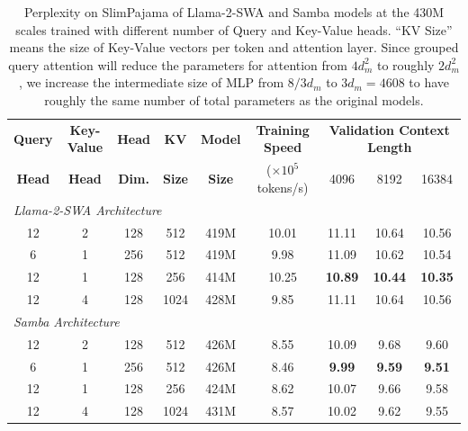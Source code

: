 \documentclass{article}
\begin{document}
\begin{table}[!htp]
\centering
\small
\caption{Perplexity on SlimPajama of Llama-2-SWA and Samba models at the 430M scales trained with different number of Query and Key-Value heads. ``KV Size'' means the size of Key-Value vectors per token and attention layer. Since grouped query attention will reduce the parameters for attention from $4d_m^2$ to roughly $2d_m^2$, we increase the intermediate size of MLP from $8/3 d_m$ to $3 d_m = 4608$ to have roughly the same number of total parameters as the original models. } 
\vspace{0.cm}
\begin{tabular}{ccccccccc}
\toprule
\bf Query & \bf Key-Value  & \multirow{1}{*}{ \bf Head } & \multirow{1}{*}{ \bf KV }  & \multirow{1}{*}{ \bf Model} & \bf Training Speed &  \multicolumn{3 }{c}{\bf Validation Context Length} \\
 \bf Head & \bf Head & \bf Dim. & \bf Size & \bf Size &  ($\times 10^5$ tokens/s)  &  4096  &   8192 &   16384 \\ 
\midrule
\multicolumn{6}{l}{\emph{Llama-2-SWA Architecture} } \\
\midrule

12      &  2   &  128  & 512  & 419M & 10.01 & 11.11 & 10.64 & 10.56 \\
6       &  1   &  256  & 512   & 419M & 9.98 & 11.09 & 10.62 & 10.54 \\
12      &  1   &  128 & 256  & 414M  & 10.25 & \bf 10.89 & \bf 10.44 & \bf 10.35 \\
12      &  4   &  128  & 1024  & 428M & 9.85  &   11.11    &  10.64    &  10.56 \\
\midrule
\multicolumn{6}{l}{\emph{Samba Architecture}} \\
\midrule
12      &  2   & 128  &  512 & 426M & 8.55 & 10.09 & 9.68 & 9.60 \\
6      &  1   & 256  &  512 & 426M  & 8.46 & \bf 9.99 & \bf 9.59 & \bf 9.51 \\
12      &  1   &  128 & 256  & 424M  & 8.62 & 10.07 & 9.66 & 9.58 \\
12      &  4   &  128  & 1024  & 431M & 8.57 & 10.02 & 9.62 & 9.55 \\

\bottomrule
\end{tabular}
\label{mqa}
\vspace{-0.4cm}
\end{table}
\end{document}
